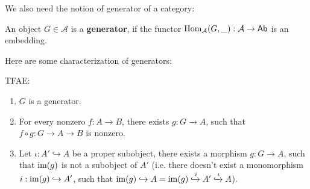 \documentclass{article}
\begin{document}
\hfil

We also need the notion of generator of a category:

\begin{defn}
    An object $G\in\mathcal{A}$ is a \textbf{generator}, if the functor $\mathrm{Hom}_\mathcal{A}(G,\_):\mathcal{A}\rightarrow \mathsf{Ab}$ is an embedding.
\end{defn}

Here are some characterization of generators:
\begin{prop}
    TFAE:
    \begin{enumerate}
        \item $G$ is a generator.
        \item For every nonzero $f:A\rightarrow B$, there exists $g:G\rightarrow A$, such that $f\circ g:G\rightarrow A\rightarrow B$ is nonzero.
        \item Let $\iota:A'\hookrightarrow A$ be a proper subobject, there exists a morphism $g:G\rightarrow A$, such that $\mathrm{im}(g)$ is not a subobject of $A'$ (i.e. there doesn't exist a monomorphism $i:\mathrm{im}(g)\hookrightarrow A'$, such that $\mathrm{im}(g)\hookrightarrow A = \mathrm{im}(g)\xhookrightarrow{i}A'\xhookrightarrow{\iota}A$).
    \end{enumerate}
\end{prop}
\end{document}
